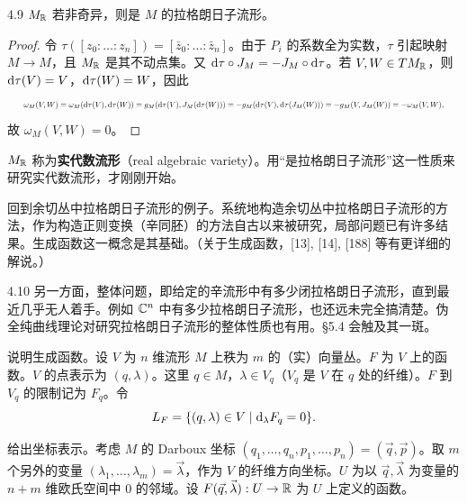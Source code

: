 \begin{lemma*}{4.9}
  $M_{\mathbb{R}}$ 若非奇异，则是 $M$ 的拉格朗日子流形。
\end{lemma*}
\begin{proof}
  令 $\tau([z_0:\dots:z_n])=[\bar z_0:\dots:\bar z_n]$。由于 $P_i$ 的系数全为实数，$\tau$ 引起映射 $M\to M$，且 $M_{\mathbb{R}}$ 是其不动点集。又 $\mathrm{d}\tau\circ J_M=-J_M\circ\mathrm{d}\tau$。若 $V,W\in TM_{\mathbb{R}}$，则 $\mathrm{d}\tau(V)=V$，$\mathrm{d}\tau(W)=W$，因此
\[
  \resizebox{0.97\linewidth}{!}{$\displaystyle \omega_M(V,W)=\omega_M(\rd\tau(V),\rd\tau(W))=g_M(\rd\tau(V),J_M(\rd\tau(W)))=-g_M(\rd\tau(V),\rd\tau(J_M(W)))=-g_M(V,J_M(W))=-\omega_M(V,W), $}
\]
  故 $\omega_M(V,W)=0$。
\end{proof}

$M_{\mathbb{R}}$ 称为\textbf{实代数流形}（real algebraic variety）。用“是拉格朗日子流形”这一性质来研究实代数流形，才刚刚开始。

回到余切丛中拉格朗日子流形的例子。系统地构造余切丛中拉格朗日子流形的方法，作为构造正则变换（辛同胚）的方法自古以来被研究，局部问题已有许多结果。生成函数这一概念是其基础。（关于生成函数，[13], [14], [188] 等有更详细的解说。）

\begin{remark}{4.10}
  另一方面，整体问题，即给定的辛流形中有多少闭拉格朗日子流形，直到最近几乎无人着手。例如 $\mathbb{C}^n$ 中有多少拉格朗日子流形，也还远未完全搞清楚。伪全纯曲线理论对研究拉格朗日子流形的整体性质也有用。§5.4 会触及其一斑。
\end{remark}

说明生成函数。设 $V$ 为 $n$ 维流形 $M$ 上秩为 $m$ 的（实）向量丛。$F$ 为 $V$ 上的函数。$V$ 的点表示为 $(q,\lambda)$。这里 $q\in M$，$\lambda\in V_q$（$V_q$ 是 $V$ 在 $q$ 处的纤维）。$F$ 到 $V_q$ 的限制记为 $F_q$。令
\[
  L_F=\{(q,\lambda)\in V\mid \mathrm{d}_\lambda F_q=0\}.
\]

给出坐标表示。考虑 $M$ 的 Darboux 坐标 $(q_1,\dots,q_n,p_1,\dots,p_n)=(\vec q,\vec p)$。取 $m$ 个另外的变量 $(\lambda_1,\dots,\lambda_m)=\vec\lambda$，作为 $V$ 的纤维方向坐标。$U$ 为以 $\vec q,\vec\lambda$ 为变量的 $n+m$ 维欧氏空间中 $0$ 的邻域。设 $F(\vec q,\vec\lambda):U\to\mathbb{R}$ 为 $U$ 上定义的函数。


